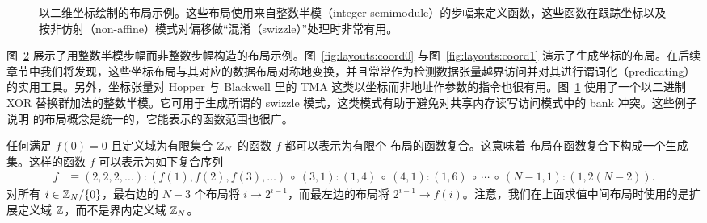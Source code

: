 \begin{figure}[ht]
\begin{subfigure}[t]{0.45\textwidth}
    \label{fig:layouts:swizzle}
\end{subfigure}
\caption{以二维坐标绘制的布局示例。这些布局使用来自整数半模（integer-semimodule）的步幅来定义函数，这些函数在跟踪坐标以及按非仿射（non-affine）模式对偏移做“混淆（swizzle）”处理时非常有用。}
\label{fig:layouts2}
\end{figure}

图~\ref{fig:layouts2} 展示了用整数半模步幅而非整数步幅构造的布局示例。图~\ref{fig:layouts:coord0} 与图~\ref{fig:layouts:coord1} 演示了生成坐标的布局。在后续章节中我们将发现，这些坐标布局与其对应的数据布局对称地变换，并且常常作为检测数据张量越界访问并对其进行谓词化（predicating）的实用工具。另外，坐标张量对 Hopper 与 Blackwell 里的 TMA 这类以坐标而非地址作参数的指令也很有用。图~\ref{fig:layouts:swizzle} 使用了一个以二进制 XOR 替换群加法的整数半模。它可用于生成所谓的 swizzle 模式，这类模式有助于避免对共享内存读写访问模式中的 bank 冲突。这些例子说明 \CuTe 的布局概念是统一的，它能表示的函数范围也很广。


任何满足 $f(0) = 0$ 且定义域为有限集合 $\mathbb{Z}_N$ 的函数 $f$ 都可以表示为有限个 \CuTe 布局的函数复合。这意味着 \CuTe 布局在函数复合下构成一个生成集。这样的函数 $f$ 可以表示为如下复合序列
\begin{align*}
f &\equiv (2,2,2,\ldots):(f(1),f(2),f(3),\ldots) \ \circ \ (3,1):(1,4) \ \circ \ (4,1):(1,6) \ \circ \ \cdots \ \circ \ (N-1,1):(1,2(N-2)).
\end{align*}
对所有 $i \in \mathbb{Z}_N / \{0\}$，最右边的 $N-3$ 个布局将 $i \to 2^{i-1}$，而最左边的布局将 $2^{i-1} \to f(i)$。注意，我们在上面求值中间布局时使用的是扩展定义域 $\mathbb{Z}$，而不是界内定义域 $\mathbb{Z}_N$。

